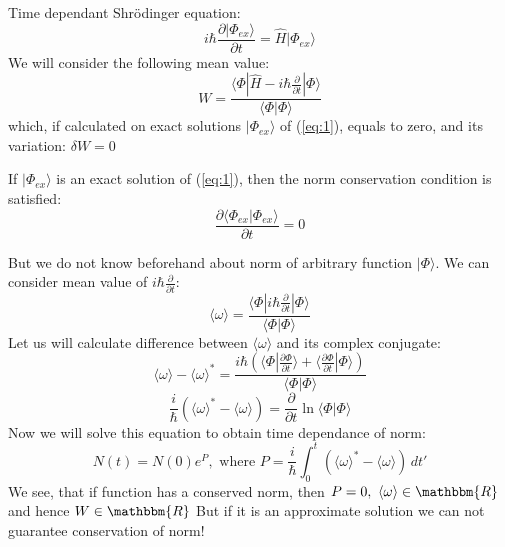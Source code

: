 Time dependant Shr\"{o}dinger equation:
\begin{equation}
i\hbar\frac{\partial |\Phi_{ex}\rangle}{\partial t} = \hat{H}|\Phi_{ex}\rangle
\label{eq:1}
\end{equation}
We will consider the following mean value:
$$W=\frac{ \langle \Phi| \hat{H} - i\hbar\frac{\partial}{\partial t} | \Phi \rangle }{\langle\Phi|\Phi\rangle}$$
which, if calculated on exact solutions $|\Phi_{ex}\rangle$ of (\ref{eq:1}), equals to zero, and its variation: $\delta W = 0$

If $|\Phi_{ex}\rangle$ is an exact solution of (\ref{eq:1}), then the norm conservation condition is satisfied:
$$\frac{\partial \langle\Phi_{ex}|\Phi_{ex}\rangle }{\partial t} = 0$$

But we do not know beforehand about norm of arbitrary function $|\Phi\rangle$.
We can consider mean value of $i\hbar\frac{\partial}{\partial t}$:
$$\langle\omega\rangle = \frac{ \langle \Phi | i\hbar\frac{\partial}{\partial t} | \Phi \rangle }{\langle\Phi|\Phi\rangle}$$
Let us will calculate difference between $\langle\omega\rangle$ and its complex conjugate:
$$\langle\omega\rangle-\langle\omega\rangle^* = \frac{i\hbar( \langle\Phi|\frac{\partial \Phi}{\partial t}\rangle + %
							      \langle\frac{\partial \Phi}{\partial t}|\Phi\rangle )}%
						     {\langle\Phi|\Phi\rangle}$$
$$\frac{i}{\hbar}\left(\langle\omega\rangle^*-\langle\omega\rangle\right) = \frac{\partial}{\partial t}\ln\langle\Phi|\Phi\rangle$$
Now we will solve this equation to obtain time dependance of norm:
$$N(t) = N(0)e^P,\text{ where } P = \frac{i}{\hbar}\int_0^t\left(\langle\omega\rangle^*-\langle\omega\rangle\right)\,dt'$$
We see, that if function has a conserved norm, then $P=0,\ \langle\omega\rangle\in\mathbbm{R}$ and hence $W\in\mathbbm{R}$
But if it is an approximate solution we can not guarantee conservation of norm!

